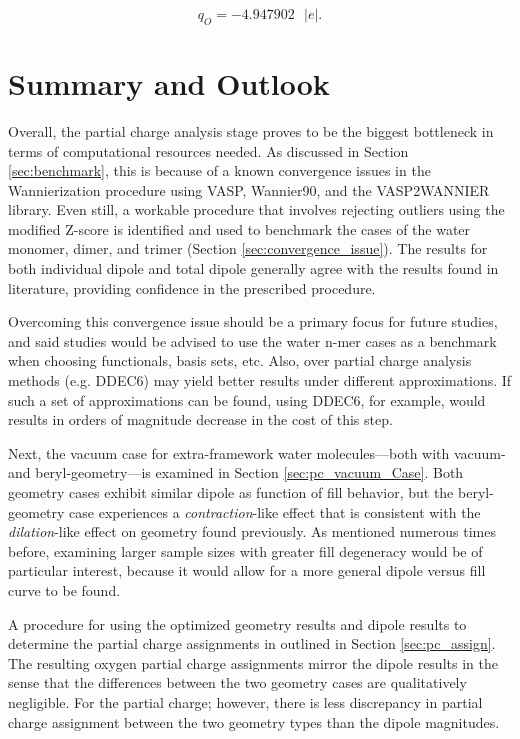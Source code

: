         \begin{equation}
            q_O = -4.947902\text{ } |e|.
        \end{equation}
        
    \section{Summary and Outlook}
    
    Overall, the partial charge analysis stage proves to be the biggest bottleneck in terms of computational resources needed. As discussed in Section \ref{sec:benchmark}, this is because of a known convergence issues in the Wannierization procedure using VASP, Wannier90, and the VASP2WANNIER library. Even still, a workable procedure that involves rejecting outliers using the modified Z-score is identified and used to benchmark the cases of the water monomer, dimer, and trimer (Section \ref{sec:convergence_issue}). The results for both individual dipole and total dipole generally agree with the results found in literature, providing confidence in the prescribed procedure.
    
    Overcoming this convergence issue should be a primary focus for future studies, and said studies would be advised to use the water n-mer cases as a benchmark when choosing functionals, basis sets, etc. Also, over partial charge analysis methods (e.g. DDEC6) may yield better results under different approximations. If such a set of approximations can be found, using DDEC6, for example, would results in orders of magnitude decrease in the cost of this step.
    
    Next, the vacuum case for extra-framework water molecules---both with vacuum- and beryl-geometry---is examined in Section \ref{sec:pc_vacuum_Case}. Both geometry cases exhibit similar dipole as function of fill behavior, but the beryl-geometry case experiences a \textit{contraction}-like effect that is consistent with the \textit{dilation}-like effect on geometry found previously. As mentioned numerous times before, examining larger sample sizes with greater fill degeneracy would be of particular interest, because it would allow for a more general dipole versus fill curve to be found.
    
    A procedure for using the optimized geometry results and dipole results to determine the partial charge assignments in outlined in Section \ref{sec:pc_assign}. The resulting oxygen partial charge assignments mirror the dipole results in the sense that the differences between the two geometry cases are qualitatively negligible. For the partial charge; however, there is less discrepancy in partial charge assignment between the two geometry types than the dipole magnitudes.
    
